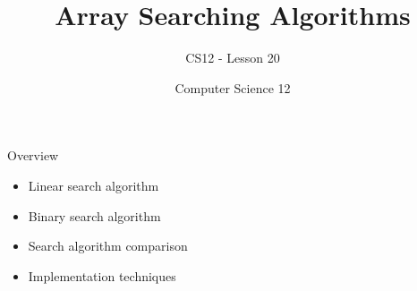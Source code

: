 \documentclass[10pt]{beamer}
\title{Array Searching Algorithms}
\subtitle{CS12 - Lesson 20}
\author{Computer Science 12}
\date{}
\begin{document}
\begin{frame}
    \titlepage
\end{frame}

\begin{frame}{Overview}
    \begin{itemize}
        \item Linear search algorithm
        \item Binary search algorithm
        \item Search algorithm comparison
        \item Implementation techniques
    \end{itemize}
\end{frame}

\end{document}
